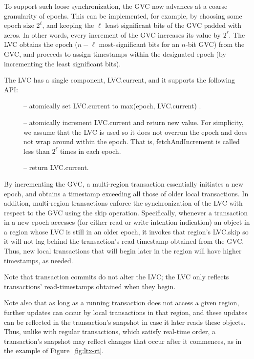 To support such loose synchronization, the GVC now advances at a coarse
granularity of epochs. This can be implemented, for example, by choosing some
epoch size $2^\ell$, and keeping the $\ell$ least significant bits of the GVC padded
with zeros. In other words, every increment of the GVC increases its value by
$2^\ell$.
The LVC obtains the epoch ($n-\ell$ most-significant bits for an $n$-bit GVC) from the
GVC, and proceeds to assign timestamps within the designated epoch (by
incrementing the least significant bits).

The LVC has a single component, LVC.current, and it supports the following API:
\begin{description}
\item[] -- atomically set LVC.current to max(epoch, LVC.current) .

\item[] -- atomically increment LVC.current and return new
value.
For simplicity, we assume that the LVC is used so it does not overrun the epoch
and does not wrap around within the epoch. That is, fetchAndIncrement is called
less than $2^\ell$ times in each epoch.

\item[] -- return LVC.current.
\end{description}

By incrementing the GVC, a multi-region transaction essentially initiates a new
epoch, and obtains a timestamp exceeding all those of older local transactions.
In addition, multi-region transactions enforce the synchronization of the LVC
with respect to the GVC using the skip operation. Specifically, whenever a
transaction in a new epoch accesses (for either read or write intention
indication) an object in a region whose LVC is still in an older epoch, it
invokes that region's LVC.skip so it will not lag behind the transaction's
read-timestamp obtained from the GVC. Thus, new local transactions that will
begin later in the region will have higher timestamps, as needed.

Note that transaction commits do not alter the LVC; the LVC only reflects
transactions' read-timestamps obtained when they  begin.

Note also that as long as a running transaction does not access a given region,
further updates can occur by local transactions in that region, and these
updates can be reflected in the transaction's snapshot in case it later reads
these objects. Thus, unlike with regular transactions, which satisfy real-time
order, a transaction's snapshot may reflect changes that occur after it
commences, as in the example of Figure~\ref{fig:ltx-rt}.

